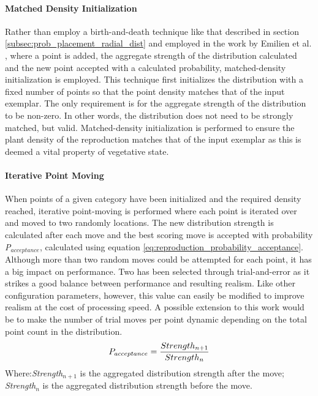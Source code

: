 \paragraph{Matched Density Initialization}

Rather than employ a birth-and-death technique like that described in section \ref{subsec:prob_placement_radial_dist} and employed in the work by Emilien et al. \cite{Emilien}, where a point is added, the aggregate strength of the distribution calculated and the new point accepted with a calculated probability, matched-density initialization is employed. This technique first initializes the distribution with a fixed number of points so that the point density matches that of the input exemplar. The only requirement is for the aggregate strength of the distribution to be non-zero. In other words, the distribution does not need to be strongly matched, but valid. Matched-density initialization is performed to ensure the plant density of the reproduction matches that of the input exemplar as this is deemed a vital property of vegetative state.\\

\paragraph{Iterative Point Moving} 

When points of a given category have been initialized and the required density reached, iterative point-moving is performed where each point is iterated over and moved to two randomly locations. The new distribution strength is calculated after each move and the best scoring move is accepted with probability \textit{P$_{acceptance}$}, calculated using equation \ref{eq:reproduction_probability_acceptance}. Although more than two random moves could be attempted for each point, it has a big impact on performance. Two has been selected through trial-and-error as it strikes a good balance between performance and resulting realism. Like other configuration parameters, however, this value can easily be modified to improve realism at the cost of processing speed. A possible extension to this work would be to make the number of trial moves per point dynamic depending on the total point count in the distribution. \\

\begin{equation}
\centering
P_{acceptance} = \frac{Strength_{n+1}}{Strength_{n}}
\label{eq:reproduction_probability_acceptance}
\end{equation}
Where:\textit{Strength$_{n+1}$} is the aggregated distribution strength after the move; \textit{Strength$_{n}$} is the aggregated distribution strength before the move.

